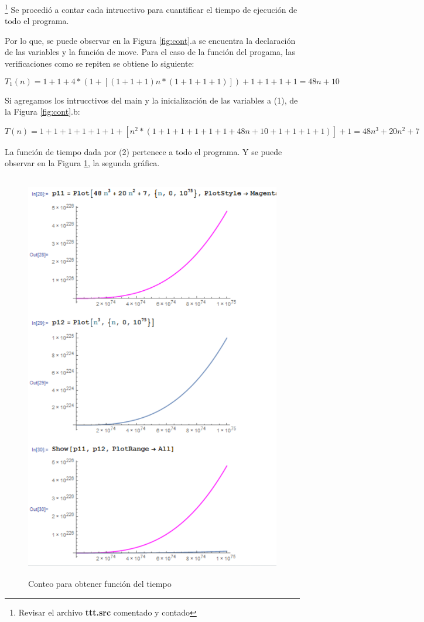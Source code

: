 \documentclass[11pt]{article}
\begin{document}
\footnote{Revisar el archivo \textbf{ttt.src} comentado y contado} Se procedió a contar cada intrucctivo para cuantificar el tiempo de ejecución de todo el programa. 
 
 Por lo que, se puede observar en la Figura \ref{fig:cont}.a se encuentra la declaración de las variables y la función de move. Para el caso de la función del progama, las verificaciones como se repiten se obtiene lo siguiente:
 
 \begin{equation}
T_{1}(n)= 1 + 1 + 4*(1 + [(1 + 1 + 1)n*(1+ 1 + 1 + 1)]) + 1 + 1 + 1 + 1 = 48n+10
\end{equation}
 
 Si agregamos los intrucctivos del main y la inicialización de las variables a (1), de la Figura \ref{fig:cont}.b:
 
 \begin{equation}
T(n)= 1 + 1 + 1 + 1 + 1 + 1 + [n^{2}*(1 + 1 + 1 + 1 + 1 + 1 + 48n + 10 + 1 + 1 + 1 + 1)] + 1 =  48n^{3} + 20n^{2} + 7
\end{equation}
 
 La función de tiempo dada por (2) pertenece a todo el programa. Y se puede observar en la Figura \ref{fig:graf}, la segunda gráfica.
 
 \begin{figure}[H]
\centering
\includegraphics[height=18cm, width=17cm]{img/Grafica1.png}
\caption{Conteo para obtener función del tiempo}
\label{fig:graf}
\end{figure}
 
\end{document}
